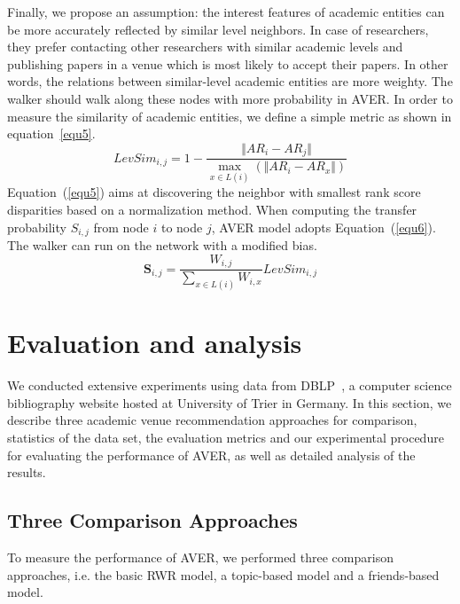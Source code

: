 \documentclass{sig-alternate-2013}
\begin{document}
Finally, we propose an assumption: the interest features of academic entities can be more accurately reflected by similar level neighbors. In case of researchers, they prefer contacting other researchers with similar academic levels and publishing papers in a venue which is most likely to accept their papers. In other words, the relations between similar-level academic entities are more weighty. The walker should walk along these nodes with more probability in AVER. In order to measure the similarity of academic entities, we define a simple metric as shown in equation~\ref{equ5}.
\begin{equation}
\label{equ5}
LevSim_{i,j}=1-\frac{\Vert AR_{i}-AR_{j}\Vert}{\max_{x\in L(i)}(\Vert AR_{i}-AR_{x}\Vert)}
\end{equation}
 Equation~(\ref{equ5}) aims at discovering the neighbor with smallest rank score disparities based on a normalization method. When computing the transfer probability $S_{i,j}$ from node $i$ to node $j$, AVER model adopts Equation~(\ref{equ6}). The walker can run on the network with a modified bias.
\begin{equation}
\label{equ6}
\mathbf{S}_{i,j}=\frac{W_{i,j}}{\sum_{x\in L(i)}W_{i,x}}LevSim_{i,j}
\end{equation}

\section{Evaluation and analysis}
\label{section:evaluation}
We conducted extensive experiments using data from DBLP~\cite{Ley:DBLP}, a computer science bibliography website hosted at University of Trier in Germany. In this section, we describe three academic venue recommendation approaches for comparison, statistics of the data set, the evaluation metrics and our experimental procedure for evaluating the performance of AVER, as well as detailed analysis of the results.

\subsection{Three Comparison Approaches}
To measure the performance of AVER, we performed three comparison approaches, i.e. the basic RWR model, a topic-based model and a friends-based model.
\end{document}
